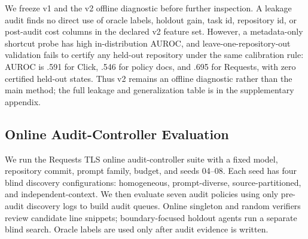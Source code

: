 \documentclass[letterpaper]{article}
\begin{document}
We freeze v1 and the v2 offline diagnostic before further inspection. A leakage
audit finds no direct use of oracle labels, holdout gain, task id, repository id,
or post-audit cost columns in the declared v2 feature set. However, a
metadata-only shortcut probe has high in-distribution AUROC, and
leave-one-repository-out validation fails to certify any held-out repository
under the same calibration rule: AUROC is .591 for Click, .546 for policy docs,
and .695 for Requests, with zero certified held-out states. Thus v2 remains an
offline diagnostic rather than the main method; the full leakage and
generalization table is in the supplementary appendix.

\subsection{Online Audit-Controller Evaluation}

We run the Requests TLS online audit-controller suite with a fixed model,
repository commit, prompt family, budget, and seeds 04--08. Each seed has four
blind discovery configurations: homogeneous, prompt-diverse, source-partitioned,
and independent-context. We then evaluate seven audit policies using only
pre-audit discovery logs to build audit queues. Online singleton and random
verifiers review candidate line snippets; boundary-focused holdout agents run a
separate blind search. Oracle labels are used only after audit evidence is
written.

\begin{table}[H]
\centering
\scriptsize
{}
\caption{Online Requests TLS audit-policy results averaged over 20
seed/configuration states. Pre R is the conservative consensus answer; union
items are retained as an evidence queue and enter the final answer only after
audit. Tokens are additional audit tokens, not discovery tokens.}
\label{tab:online-audit}
\end{table}
\end{document}
